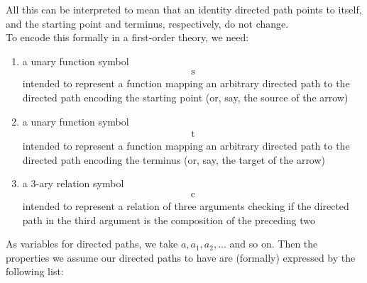 All this can be interpreted to mean that an identity directed path points to itself, and the starting point and terminus, respectively, do not change.
\\
To encode this formally in a first-order theory, we need:
\begin{enumerate}
\item[(1)]
a unary function symbol
\begin{align*}
  \mathrm{s}
\end{align*}
intended to represent a function mapping an arbitrary directed path to the directed path encoding the starting point (or, say, the source of the arrow)
\item[(2)]
a unary function symbol
\begin{align*}
  \mathrm{t}
\end{align*}
intended to represent a function mapping an arbitrary directed path to the directed path encoding the terminus (or, say, the target of the arrow)
\item[(3)]
a $3$-ary relation symbol
\begin{align*}
  \mathrm{c}
\end{align*}
intended to represent a relation of three arguments checking if the directed path in the third argument is the composition of the preceding two
\end{enumerate}
As variables for directed paths, we take $a,a_{1},a_{2},\ldots$ and so on.
Then the properties we assume our directed paths to have are (formally) expressed by the following list:
